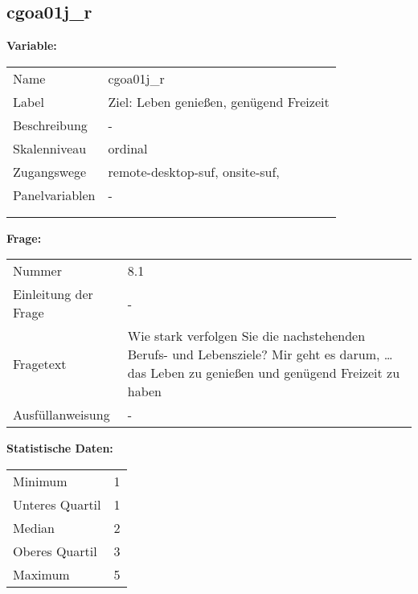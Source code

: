 	
	
	\subsection{cgoa01j\_r}
	\label{subSection:cgoa01j_r}

	\noindent\textbf{Variable:}\\
		\begin{tabular}{lL{11.3cm}}
			\label{tableVariable:cgoa01j_r}
			Name & cgoa01j\_r \\
			Label & Ziel: Leben genießen, genügend Freizeit \\
			Beschreibung & - \\
			Skalenniveau & ordinal \\
			Zugangswege &
				remote-desktop-suf,
				onsite-suf,
 \\
			Panelvariablen & -
			 \\
			 \\
 \\
		\end{tabular}

		\vspace*{1 cm}
		\noindent\textbf{Frage:}\\
		\begin{tabular}{lL{11.3cm}}
			\label{tableQuestion:cgoa01j_r}
			Nummer & 8.1 \\
			Einleitung der Frage & - \\
			Fragetext & Wie stark verfolgen Sie die nachstehenden Berufs- und Lebensziele?
Mir geht es darum, …
das Leben zu genießen und genügend Freizeit zu haben \\
			Ausfüllanweisung & - \\
		\end{tabular}


		\vspace*{1 cm}
		\noindent\textbf{Statistische Daten:}\\
			\begin{tabular}{ll}
				\label{tableStatistics:cgoa01j_r}
					Minimum & 1 \\
					Unteres Quartil & 1 \\
					Median & 2 \\
					Oberes Quartil & 3 \\
					Maximum & 5 \\
			\end{tabular}



